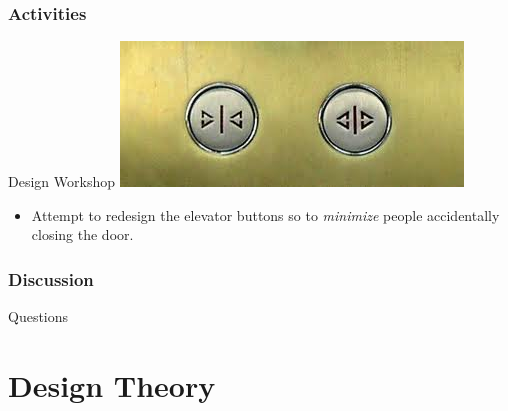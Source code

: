 \documentclass{beamer}
\begin{document}

\begin{frame}
	\frametitle{Activities}
	\begin{block}{Design Workshop}
	\centering
	\includegraphics[width=.5\linewidth]{elevator_bt}
	\begin{itemize}
		\item Attempt to redesign the elevator buttons so to \textit{minimize} people accidentally closing the door.
	\end{itemize}
	\end{block}
\end{frame}

\begin{frame}
	\frametitle{Discussion}
\end{frame}


\begin{frame}
\Huge{\centerline{Questions}}
\end{frame}

\section{Design Theory}
\end{document}
